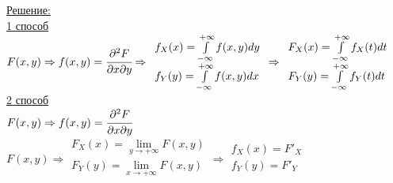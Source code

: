 \underline{Решение:}\\
\underline{1 способ}\\
$\displaystyle  F(x,y) \Rightarrow f(x,y) = \cfrac{\partial^2 F}{\partial x \partial y} \Rightarrow
\begin{array}{lll}
	f_X(x) = \int\limits_{-\infty}^{+\infty} f(x,y) dy\\
	f_Y(y) = \int\limits_{-\infty}^{+\infty} f(x,y) dx\\
\end{array} \Rightarrow
\begin{array}{lll}
	F_X(x) = \int\limits_{-\infty}^{+\infty} f_X(t) dt\\
	F_Y(y) = \int\limits_{-\infty}^{+\infty} f_Y(t) dt\\
\end{array}$\\

\underline{2 способ}\\
$F(x,y) \Rightarrow f(x,y) = \cfrac{\partial^2 F}{\partial x \partial y}$\\
$F(x,y) \Rightarrow 
\begin{array}{lll}
	F_X(x) = \lim\limits_{y \to +\infty} F(x,y)\\
	F_Y(y) = \lim\limits_{x \to +\infty} F(x,y)\\
\end{array} \Rightarrow
\begin{array}{lll}
	f_X(x) = F'_X\\
	f_Y(y) = F'_Y\\
\end{array}$\\

